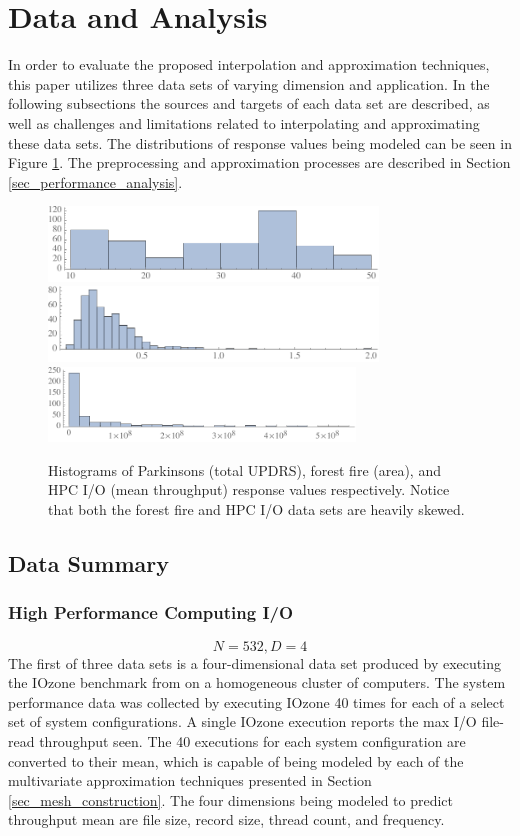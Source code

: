 \section{Data and Analysis}
In order to evaluate the proposed interpolation and approximation techniques, this paper utilizes three data sets of varying dimension and application. In the following subsections the sources and targets of each data set are described, as well as challenges and limitations related to interpolating and approximating these data sets. The distributions of response values being modeled can be seen in Figure \ref{fig_response_hists}. The preprocessing and approximation processes are described in Section \ref{sec_performance_analysis}.

\begin{figure}
  \includegraphics[width=.5\textwidth,height=2cm]{p-hist.pdf}
  \includegraphics[width=.5\textwidth,height=2cm]{f-hist.pdf}
  \includegraphics[width=.5\textwidth,height=2cm]{h-hist.pdf}
  \caption{Histograms of Parkinsons (total UPDRS), forest fire (area), and HPC I/O (mean throughput) response values respectively. Notice that both the forest fire and HPC I/O data sets are heavily skewed.
  \vspace{-.5cm}}
  \label{fig_response_hists}
\end{figure}

\subsection{Data Summary}

\subsubsection{High Performance Computing I/O}
$$N = 532, D = 4$$
The first of three data sets is a four-dimensional data set produced by executing the IOzone benchmark from \cite{iozone} on a homogeneous cluster of computers. The system performance data was collected by executing IOzone 40 times for each of a select set of system configurations. A single IOzone execution reports the max I/O file-read throughput seen. The 40 executions for each system configuration are converted to their mean, which is capable of being modeled by each of the multivariate approximation techniques presented in Section \ref{sec_mesh_construction}. The four dimensions being modeled to predict throughput mean are file size, record size, thread count, and frequency.

